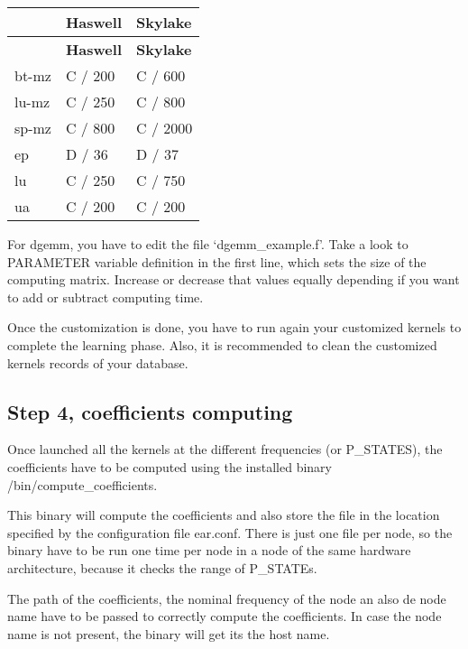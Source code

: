 \tabulinesep=1mm
\begin{longtabu} spread 0pt [c]{*3{|X[-1]}|}
\hline
{}&{\bf Haswell }&{\bf Skylake  }\\
\endfirsthead
\hline
\endfoot
\hline
{}&{\bf Haswell }&{\bf Skylake  }\\
\endhead
bt-\/mz &C / 200 &C / 600 \\
lu-\/mz &C / 250 &C / 800 \\
sp-\/mz &C / 800 &C / 2000 \\
ep &D / 36 &D / 37 \\
lu &C / 250 &C / 750 \\
ua &C / 200 &C / 200 \\
\end{longtabu}
For {\ttfamily dgemm}, you have to edit the file ‘dgemm\+\_\+example.\+f’. Take a look to P\+A\+R\+A\+M\+E\+T\+ER variable definition in the first line, which sets the size of the computing matrix. Increase or decrease that values equally depending if you want to add or subtract computing time.

Once the customization is done, you have to run again your customized kernels to complete the learning phase. Also, it is recommended to clean the customized kernels records of your database.

\subsection*{Step 4, coefficients computing }

Once launched all the kernels at the different frequencies (or P\+\_\+\+S\+T\+A\+T\+ES), the coefficients have to be computed using the installed binary {\ttfamily /bin/compute\+\_\+coefficients}.

This binary will compute the coefficients and also store the file in the location specified by the configuration file {\ttfamily ear.\+conf}. There is just one file per node, so the binary have to be run one time per node in a node of the same hardware architecture, because it checks the range of P\+\_\+\+S\+T\+A\+T\+Es.

The path of the coefficients, the nominal frequency of the node an also de node name have to be passed to correctly compute the coefficients. In case the node name is not present, the binary will get it\textquotesingle{}s the host name.

